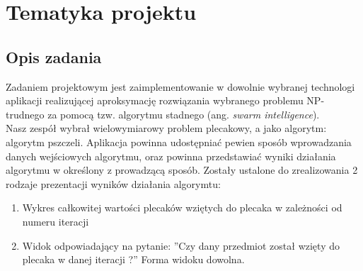 \documentclass[a4paper,12pt,notitlepage]{mwrep}
\begin{document}
\onehalfspacing


\rfoot{\scriptsize{\wersja}}
\setcounter{secnumdepth}{2}

\setcounter{tocdepth}{2}


\vfill
\begin{center}
\singlespacing
{}
\onehalfspacing
\end{center}

\tableofcontents

\chapter{Tematyka projektu}
\section{Opis zadania}
Zadaniem projektowym jest zaimplementowanie w dowolnie wybranej technologi aplikacji
realizującej aproksymację rozwiązania wybranego problemu NP-trudnego
za pomocą tzw. algorytmu stadnego (ang. \emph{swarm intelligence}).\\
Nasz zespół wybrał wielowymiarowy problem plecakowy, a jako algorytm:
algorytm pszczeli.
Aplikacja powinna udostępniać pewien sposób wprowadzania danych wejściowych algorytmu,
oraz powinna przedstawiać wyniki działania algorytmu w określony z prowadzącą sposób.\de
Zostały ustalone do zrealizowania 2 rodzaje prezentacji wyników działania algorymtu:
\begin{enumerate}
	\item	Wykres całkowitej wartości plecaków wziętych do plecaka
			w zależności od numeru iteracji
	\item	Widok odpowiadający na pytanie: ''Czy dany przedmiot został wzięty
			do plecaka w danej iteracji ?''
			Forma widoku dowolna.
\end{enumerate}
\end{document}
